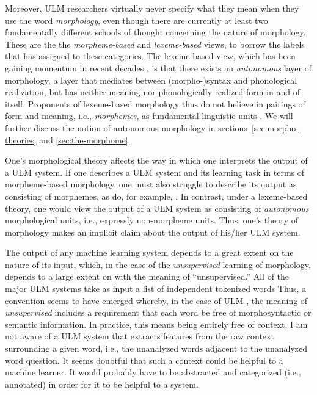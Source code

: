 Moreover, \ac{ULM} researchers virtually never specify what they mean
when they use the word \emph{morphology}, even though there
are currently at least two fundamentally different schools of thought concerning the nature of morphology. These are the 
the \emph{morpheme-based} and \emph{lexeme-based} views, to borrow the labels that \cite{aronoff:1994} has assigned 
to these categories. The lexeme-based view, which has been gaining momentum in recent decades \citep{anderson:2017},
is that there exists an \emph{autonomous} layer of morphology, a layer that mediates between (morpho-)syntax
and phonological realization, but has neither meaning nor phonologically realized form in and of itself. Proponents
of lexeme-based morphology thus do not believe in pairings of form and meaning, i.e., \emph{morphemes}, as fundamental linguistic
units \citep{anderson:2015}. We will further discuss the notion of autonomous morphology in sections~\ref{sec:morpho-theories} and
\ref{sec:the-morphome}.

One's morphological theory affects the way in which one interprets the output of a \ac{ULM}  system. 
If one describes a \ac{ULM}  system and its learning task in terms of 
morpheme-based morphology, one must also struggle to 
describe its output as consisting of morphemes, as do, for example, 
\cite{creutz-and-lagus:2007,creutz-and-lagus:2005}. In contrast, under a 
lexeme-based theory, one would view the output of a \ac{ULM}  system as 
consisting of \emph{autonomous} morphological units, i.e., 
expressly non-morpheme units. 
Thus, one's theory of morphology makes an implicit claim about the output of 
his/her \ac{ULM}  system.

The output of any machine learning system depends to 
a great extent on the nature of its input, which, in the case of the 
\emph{unsupervised} learning of morphology, 
depends to a large extent on with the meaning of ``unsupervised.'' 
All of the major \ac{ULM}  
systems take as input a list of independent tokenized words 
\citep[e.g.,][]{goldsmith:2001,baroni-et-al:2002,creutz-and-lagus:2005,poon-et-al:2009}
Thus, a convention seems to have emerged whereby, in the 
case of \ac{ULM} , the meaning of \emph{unsupervised} includes a
requirement that each word be free of morphosyntactic 
or semantic information. In practice,
this means being entirely free of context. I am 
not aware of a \ac{ULM} system that extracts features from the raw context surrounding a given word, i.e.,
the unanalyzed words adjacent to the unanalyzed word question. It seems doubtful
that such a context could be helpful to a machine learner. 
It would probably have to be abstracted and categorized 
(i.e., annotated) in order
for it to be helpful to a system.

